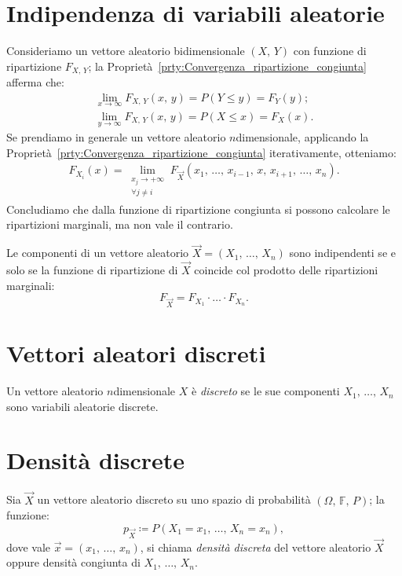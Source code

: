     \section{Indipendenza di variabili aleatorie}
        \begin{obsv}
            Consideriamo un vettore aleatorio bidimensionale $(X,\,Y)$ con funzione di ripartizione $F_{X,\,Y}$; la Proprietà~\ref{prty:Convergenza_ripartizione_congiunta} afferma che:
            \begin{gather*}
                \lim_{x \to \infty} F_{X,\,Y}(x,\,y) = P(Y \leq y) = F_Y(y); \\
                \lim_{y \to \infty} F_{X,\,Y}(x,\,y) = P(X \leq x) = F_X(x)
            .\end{gather*}
            Se prendiamo in generale un vettore aleatorio $n$\nbdash dimensionale, applicando la Proprietà~\ref{prty:Convergenza_ripartizione_congiunta} iterativamente, otteniamo:
            \begin{align*}
                F_{X_i}(x) = \lim_{\substack{x_j \rightarrow +\infty \\ \forall j \neq i}} F_{\vec{X}}(x_1,\, \ldots,\, x_{i-1},\, x,\, x_{i+1},\, \ldots,\, x_{n})
            .\end{align*}
            Concludiamo che dalla funzione di ripartizione congiunta si possono calcolare le ripartizioni marginali, ma non vale il contrario.
        \end{obsv}
        \begin{defn}
            Le componenti di un vettore aleatorio $\vec{X} = (X_1,\, \ldots,\, X_{n})$ sono indipendenti se e solo se la funzione di ripartizione di $\vec{X}$ coincide col prodotto delle ripartizioni marginali: \[
            F_{\vec{X}} = F_{X_1} \cdot \ldots \cdot F_{X_n}
            .\] 
        \end{defn}
    \section{Vettori aleatori discreti}
        \begin{defn}
            Un vettore aleatorio $n$\nbdash dimensionale $X$ è \emph{discreto} se le sue componenti $X_1,\, \ldots,\, X_{n}$ sono variabili aleatorie discrete.
        \end{defn}
    \section{Densità discrete}
        \begin{defn}\label{defn:Densità_congiunta}
            Sia $\vec{X}$ un vettore aleatorio discreto su uno spazio di probabilità $(\Omega,\,\mathbb{F},\,P)$; la funzione: \[
                p_{\vec{X}} \coloneqq P(X_1 = x_1,\, \ldots,\, X_n = x_n)
            ,\] dove vale $\vec{x} = (x_1,\, \ldots,\, x_{n})$, si chiama  \emph{densità discreta} del vettore aleatorio $\vec{X}$ oppure densità congiunta di $X_1,\, \ldots,\, X_{n}$.
        \end{defn}
